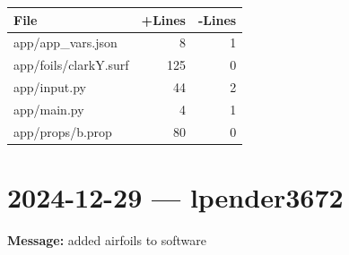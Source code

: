 \documentclass{article}
\begin{document}
\begin{longtable}{|p{10cm}|r|r|}
\hline \textbf{File} & \textbf{+Lines} & \textbf{-Lines} \\
\hline
app/app\_vars.json & 8 & 1 \\
\hline
app/foils/clarkY.surf & 125 & 0 \\
\hline
app/input.py & 44 & 2 \\
\hline
app/main.py & 4 & 1 \\
\hline
app/props/b.prop & 80 & 0 \\
\hline
\end{longtable}

\section*{2024-12-29 --- lpender3672}
\textbf{Message:} added airfoils to software
\end{document}
